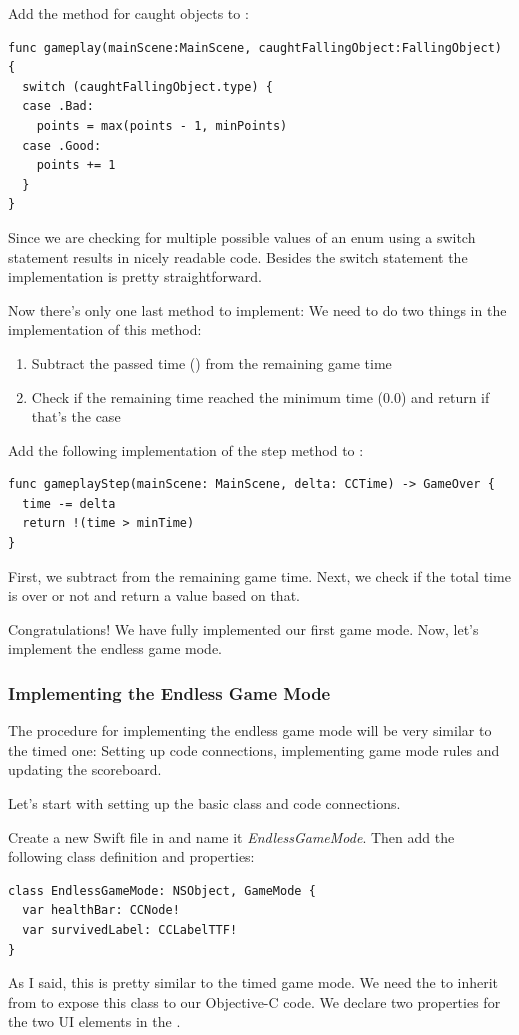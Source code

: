 \begin{leftbar}
Add the method for caught objects to :
\begin{lstlisting}
func gameplay(mainScene:MainScene, caughtFallingObject:FallingObject) {
  switch (caughtFallingObject.type) {
  case .Bad:
    points = max(points - 1, minPoints)
  case .Good:
    points += 1
  }
}
\end{lstlisting}
\end{leftbar}
Since we are checking for multiple possible values of an enum using a switch
statement results in nicely readable code. Besides the switch statement the
implementation is pretty straightforward.

Now there's only one last method to implement:
 We need to do two things in the
implementation of this method:
\begin{enumerate}
  \item Subtract the passed time () from the remaining game
  time
  \item Check if the remaining time reached the minimum time (0.0) and return
   if that's the case
\end{enumerate}
\begin{leftbar}
Add the following implementation of the step method to
:
\begin{lstlisting}
func gameplayStep(mainScene: MainScene, delta: CCTime) -> GameOver {
  time -= delta
  return !(time > minTime)
}
\end{lstlisting}
\end{leftbar}
First, we subtract  from the remaining game time. Next, we
check if the total time is over or not and return a  value
based on that.

Congratulations! We have fully implemented our first game mode. Now, let's
implement the endless game mode.

\subsubsection{Implementing the Endless Game Mode}
The procedure for implementing the endless game mode will be very similar to the
timed one: Setting up code connections, implementing game mode rules and
updating the scoreboard.

Let's start with setting up the basic class and code connections.
\begin{leftbar}
Create a new Swift file in \xcode{} and name it \textit{EndlessGameMode}. Then
add the following class definition and properties:
\begin{lstlisting}
class EndlessGameMode: NSObject, GameMode {
  var healthBar: CCNode!
  var survivedLabel: CCLabelTTF!
}
\end{lstlisting}
\end{leftbar}
As I said, this is pretty similar to the timed game mode. We need the to inherit
from  to expose this class to our Objective-C code.
We declare two properties for the two UI elements in the  \ccbfile{}.

